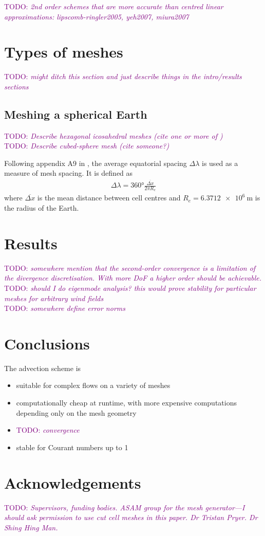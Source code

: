 \documentclass[times]{elsarticle}
\newcommand{\TODO}[1]{\textcolor{purple}{TODO: \emph{#1}}}
\begin{document}
\TODO{2nd order schemes that are more accurate than centred linear approximations: lipscomb-ringler2005, yeh2007, miura2007}

\section{Types of meshes}
\TODO{might ditch this section and just describe things in the intro/results sections}

\subsection{Meshing a spherical Earth}

\TODO{Describe hexagonal icosahedral meshes (cite one or more of \citep{thuburn2014,heikes-randall1995a,heikes-randall1995b})} \\
\TODO{Describe cubed-sphere mesh (cite someone?)}

Following appendix A9 in \citep{lauritzen2014}, the average equatorial spacing $\Delta \lambda$ is used as a measure of mesh spacing.  It is defined as
\begin{align}
	\Delta \lambda = \ang{360} \frac{\overline{\Delta x}}{2 \pi R_e}
\end{align}
where $\overline{\Delta x}$ is the mean distance between cell centres and $R_e = \SI{6.3712e6}{\meter}$ is the radius of the Earth.



\section{Results}
\label{sec:results}

\TODO{somewhere mention that the second-order convergence is a limitation of the divergence discretisation.  With more DoF a higher order should be achievable.} \\
\TODO{should I do eigenmode analysis?  this would prove stability for particular meshes for arbitrary wind fields} \\
\TODO{somewhere define error norms}





\section{Conclusions}

The advection scheme is
\begin{itemize}
	\item suitable for complex flows on a variety of meshes
	\item computationally cheap at runtime, with more expensive computations depending only on the mesh geometry
	\item \TODO{convergence}
	\item stable for Courant numbers up to 1
\end{itemize}

\section{Acknowledgements}
\TODO{Supervisors, funding bodies.  ASAM group for the mesh generator---I should ask permission to use cut cell meshes in this paper.  Dr Tristan Pryer.  Dr Shing Hing Man.}





\end{document}
